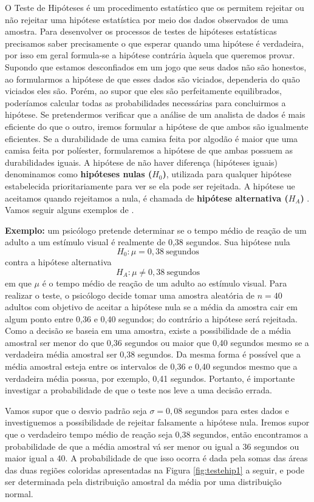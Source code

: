 \documentclass[
]{book}
\begin{document}
O Teste de Hipóteses é um procedimento estatístico que os permitem rejeitar ou não rejeitar uma hipótese estatística por meio dos dados observados de uma amostra. Para desenvolver os processos de testes de hipóteses estatísticas precisamos saber precisamente o que esperar quando uma hipótese é verdadeira, por isso em geral formula-se a hipótese contrária àquela que queremos provar. Supondo que estamos desconfiados em um jogo que seus dados não são honestos, ao formularmos a hipótese de que esses dados são viciados, dependeria do quão viciados eles são. Porém, ao supor que eles são perfeitamente equilibrados, poderíamos calcular todas as probabilidades necessárias para concluirmos a hipótese. Se pretendermos verificar que a análise de um analista de dados é mais eficiente do que o outro, iremos formular a hipótese de que ambos são igualmente eficientes. Se a durabilidade de uma camisa feita por algodão é maior que uma camisa feita por políester, formularemos a hipótese de que ambas possuem as durabilidades iguais. A hipótese de não haver diferença (hipóteses iguais) denominamos como \textbf{hipóteses nulas (\(H_0\))}, utilizada para qualquer hipótese estabelecida prioritariamente para ver se ela pode ser rejeitada. A hipótese ue aceitamos quando rejeitamos a nula, é chamada de \textbf{hipótese alternativa (\(H_A\))} \citep{freund2009estatistica}. Vamos seguir alguns exemplos de \citet{freund2009estatistica}.

\textbf{Exemplo:} um psicólogo pretende determinar se o tempo médio de reação de um adulto a um estímulo visual é realmente de 0,38 segundos. Sua hipótese nula
\[H_0: \mu=0,38\ \mbox{segundos}\]
contra a hipótese alternativa
\[H_A: \mu \neq 0,38\ \mbox{segundos}\]
em que \(\mu\) é o tempo médio de reação de um adulto ao estímulo visual. Para realizar o teste, o psicólogo decide tomar uma amostra aleatória de \(n=40\) adultos com objetivo de aceitar a hipótese nula se a média da amostra cair em algum ponto entre 0,36 e 0,40 segundos; do contrário a hipótese será rejeitada. Como a decisão se baseia em uma amostra, existe a possibilidade de a média amostral ser menor do que 0,36 segundos ou maior que 0,40 segundos mesmo se a verdadeira média amostral ser 0,38 segundos. Da mesma forma é possível que a média amostral esteja entre os intervalos de 0,36 e 0,40 segundos mesmo que a verdadeira média possua, por exemplo, 0,41 segundos. Portanto, é importante investigar a probabilidade de que o teste nos leve a uma decisão errada.

Vamos supor que o desvio padrão seja \(\sigma=0,08\) segundos para estes dados e investiguemos a possibilidade de rejeitar falsamente a hipótese nula. Iremos supor que o verdadeiro tempo médio de reação seja 0,38 segundos, então encontramos a probabilidade de que a média amostral vá ser menor ou igual a 36 segundos ou maior igual a 40. A probabilidade de que isso ocorra é dada pela somas das áreas das duas regiões coloridas apresentadas na Figura \ref{fig:testehip1} a seguir, e pode ser determinada pela distribuição amostral da média por uma distribuição normal.
\end{document}
